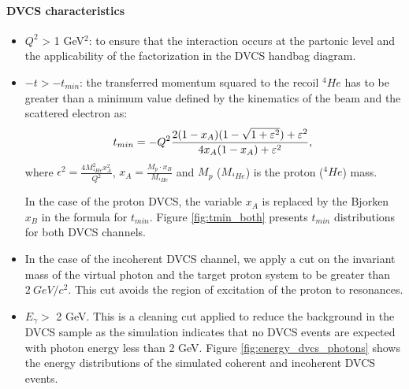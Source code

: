 \paragraph{DVCS characteristics}
\begin{itemize}
 \item $Q^{2}$ > 1 GeV$^{2}$: to ensure that the interaction occurs at the 
    partonic level and the applicability of the factorization in the DVCS  
    handbag diagram.
\item $ -t > -t_{min}$: the transferred momentum squared to the recoil $^{4}He$ 
   has to be greater than a minimum value defined by the kinematics of the beam 
   and the scattered electron as:
\begin{equation}
   t_{min} = - Q^{2} \frac{2(1- x_{A})(1 - \sqrt{1 + \epsilon ^{2}}) + \epsilon 
   ^{2}}{4 x_{A}(1-x_{A})+ \epsilon ^{2}},\\
\end{equation}
where $\epsilon ^{2} = \frac{4M^{2}_{^4He}x^{2}_{A}}{Q^{2}}$, $x_{A} = 
\frac{M_{p}\cdot x_{B}}{M_{^4He}}$ and $M_{p}$ ($M_{^4He}$) is the proton 
($^{4}He$) mass.

In the case of the proton DVCS, the variable $x_{A}$ is replaced by the Bjorken 
$x_{B}$ in the formula for $t_{min}$. Figure \ref{fig:tmin_both} presents 
$t_{min}$ distributions for both DVCS channels.

\item In the case of the incoherent DVCS channel, we apply a cut on the 
   invariant mass of the virtual photon and the target proton system to be
   greater than $2~GeV/c{^2}$. This cut avoids the region of excitation of the 
   proton to resonances.
 
\item $E_{\gamma}>$ 2 GeV. This is a cleaning cut applied to reduce the 
   background in the DVCS sample as the simulation indicates that no DVCS 
   events are expected with photon energy less than 2 GeV. Figure 
   \ref{fig:energy_dvcs_photons} shows the energy distributions of the 
   simulated coherent and incoherent DVCS events.


\end{itemize}
